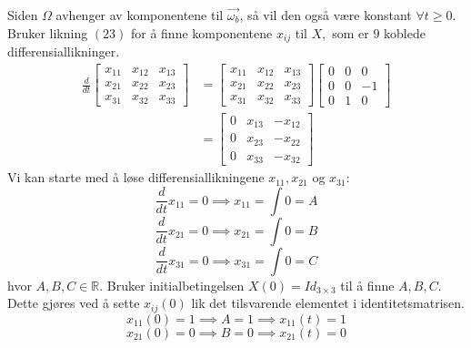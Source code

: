 Siden $\Omega$ avhenger av komponentene til $\vec{\omega_b}$, så vil den også være konstant $\forall t\geq 0.$ \newline\newline
Bruker likning $(23)$ for å finne komponentene $x_{ij}$ til $X,$ som er $9$ koblede differensiallikninger.
\begin{equation}
\begin{aligned}
    \frac{d}{dt}\begin{bmatrix}x_{11}&x_{12}&x_{13}\\x_{21}&x_{22}&x_{23}\\x_{31}&x_{32}&x_{33}\end{bmatrix}&=\begin{bmatrix}x_{11}&x_{12}&x_{13}\\x_{21}&x_{22}&x_{23}\\x_{31}&x_{32}&x_{33}\end{bmatrix}\begin{bmatrix}0&0&0\\0&0&-1\\0&1&0\end{bmatrix}\\
    &=\begin{bmatrix}0&x_{13}&-x_{12}\\0&x_{23}&-x_{22}\\0&x_{33}&-x_{32}\end{bmatrix}
\end{aligned}
\end{equation}
Vi kan starte med å løse differensiallikningene $x_{11}, x_{21}$ og $x_{31}:$
\begin{equation}
    \frac{d}{dt}x_{11}=0\implies x_{11}=\int{0}=A
\end{equation}
\begin{equation}
    \frac{d}{dt}x_{21}=0\implies x_{21}=\int{0}=B
\end{equation}
\begin{equation}
    \frac{d}{dt}x_{31}=0\implies x_{31}=\int{0}=C
\end{equation}
hvor $A, B, C\in\mathbb{R}.$ Bruker initialbetingelsen $X(0)=Id_{3\times3}$ til å finne $A, B, C$. Dette gjøres ved å sette $x_{ij}(0)$ lik det tilsvarende elementet i identitetsmatrisen.
\begin{equation}
    x_{11}(0)=1\implies A=1\implies x_{11}(t)=1
\end{equation}
\begin{equation}
    x_{21}(0)=0\implies B=0\implies x_{21}(t)=0
\end{equation}

